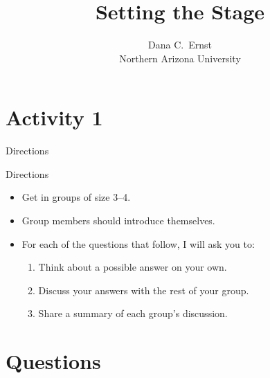 \documentclass[10pt]{beamer}
\title{Setting the Stage}
\subtitle{}
\author{{\large Dana C.~Ernst}\\
Northern Arizona University}
\date{}
\begin{document}

\maketitle


\section{Activity 1}


\begin{frame}{Directions}

\vspace{3em}

\begin{block}{Directions}
\vspace{-.5em}
\begin{itemize}
\item Get in groups of size 3--4.
\item Group members should introduce themselves.
\item For each of the questions that follow, I will ask you to:
\begin{enumerate}
\item \alert{Think} about a possible answer on your own.
\item \alert{Discuss} your answers with the rest of your group.
\item \alert{Share} a summary of each group's discussion.
\end{enumerate}
\end{itemize}
\end{block}

\end{frame}


\section{Questions}


\begin{frame}%
\ 

\vfill


\vfill

\end{frame}
\end{document}
